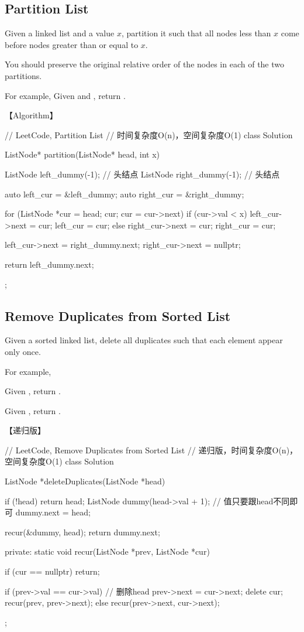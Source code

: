 \subsection{Partition List}
\label{sec:partition-list}



Given a linked list and a value $x$, partition it such that all nodes less than
$x$ come before nodes greater than or equal to $x$.

You should preserve the original relative order of the nodes in each of the two
partitions.

For example,
Given  and , return .


【Algorithm】
\begin{Code}
	// LeetCode, Partition List
	// 时间复杂度O(n)，空间复杂度O(1)
	class Solution {
		ListNode* partition(ListNode* head, int x) {
			ListNode left_dummy(-1); // 头结点
			ListNode right_dummy(-1); // 头结点
			
			auto left_cur = &left_dummy;
			auto right_cur = &right_dummy;
			
			for (ListNode *cur = head; cur; cur = cur->next) {
				if (cur->val < x) {
					left_cur->next = cur;
					left_cur = cur;
				} else {
					right_cur->next = cur;
					right_cur = cur;
				}
			}
		
			left_cur->next = right_dummy.next;
			right_cur->next = nullptr;
		
			return left_dummy.next;
		}
	};
\end{Code}


\subsection{Remove Duplicates from Sorted List}
\label{sec:remove-duplicates-from-sorted-list}



Given a sorted linked list, delete all duplicates such that each element appear
only once.

For example,

Given , return .

Given , return .


【递归版】
\begin{Code}
	// LeetCode, Remove Duplicates from Sorted List
	// 递归版，时间复杂度O(n)，空间复杂度O(1)
	class Solution {
		ListNode *deleteDuplicates(ListNode *head) {
			if (!head) return head;
				ListNode dummy(head->val + 1); // 值只要跟head不同即可
			dummy.next = head;
			
			recur(&dummy, head);
			return dummy.next;
		}
		private:
		static void recur(ListNode *prev, ListNode *cur) {
			if (cur == nullptr) return;
			
			if (prev->val == cur->val) { // 删除head
				prev->next = cur->next;
				delete cur;
				recur(prev, prev->next);
			} else {
				recur(prev->next, cur->next);
			}
		}
	};
\end{Code}


